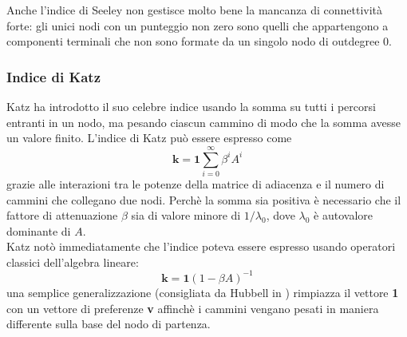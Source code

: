 Anche l'indice di Seeley non gestisce molto bene la mancanza di connettività forte: gli unici nodi con un punteggio non zero sono quelli che appartengono a componenti terminali che non sono formate da un singolo nodo di outdegree 0.
\subsubsection{Indice di Katz}
Katz ha introdotto il suo celebre indice %
usando la somma su tutti i percorsi entranti in un nodo, ma pesando ciascun cammino di modo che la somma avesse un valore finito. L'indice di Katz può essere espresso come
\begin{equation}
    \textbf{k} = \textbf{1} \sum_{i = 0}^{\infty}{\beta^i A^i}
\end{equation}
grazie alle interazioni tra le potenze della matrice di adiacenza e il numero di cammini che collegano due nodi. Perchè la somma sia positiva è necessario che il fattore di attenuazione $\beta$ sia di valore minore di $1 / \lambda_0$, dove $\lambda_0$ è autovalore dominante di $A$.\\
Katz notò immediatamente che l'indice poteva essere espresso usando operatori classici dell'algebra lineare:
\begin{equation}
    \textbf{k} = \textbf{1}(1 - \beta A)^{-1}
\end{equation}
una semplice generalizzazione (consigliata da Hubbell in %
) rimpiazza il vettore \textbf{1} con un vettore di preferenze \textbf{v} affinchè i cammini vengano pesati in maniera differente sulla base del nodo di partenza.
